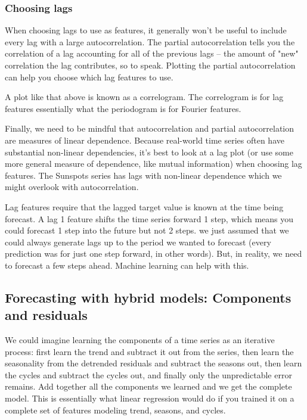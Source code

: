 \documentclass[12pt]{report}
\begin{document}
\subsubsection{Choosing lags}
When choosing lags to use as features, it generally won't be useful to include every lag with a large autocorrelation. The partial autocorrelation tells you the correlation of a lag accounting for all of the previous lags -- the amount of "new" correlation the lag contributes, so to speak. Plotting the partial autocorrelation can help you choose which lag features to use.

A plot like that above is known as a correlogram. The correlogram is for lag features essentially what the periodogram is for Fourier features.

Finally, we need to be mindful that autocorrelation and partial autocorrelation are measures of linear dependence. Because real-world time series often have substantial non-linear dependencies, it's best to look at a lag plot (or use some more general measure of dependence, like mutual information) when choosing lag features. The Sunspots series has lags with non-linear dependence which we might overlook with autocorrelation.

Lag features require that the lagged target value is known at the time being forecast. A lag 1 feature shifts the time series forward 1 step, which means you could forecast 1 step into the future but not 2 steps. we just assumed that we could always generate lags up to the period we wanted to forecast (every prediction was for just one step forward, in other words). But, in reality, we need to forecast a few steps ahead. Machine learning can help with this.

\subsection{Forecasting with hybrid models: Components and residuals}

We could imagine learning the components of a time series as an iterative process: first learn the trend and subtract it out from the series, then learn the seasonality from the detrended residuals and subtract the seasons out, then learn the cycles and subtract the cycles out, and finally only the unpredictable error remains. Add together all the components we learned and we get the complete model. This is essentially what linear regression would do if you trained it on a complete set of features modeling trend, seasons, and cycles.
\end{document}
